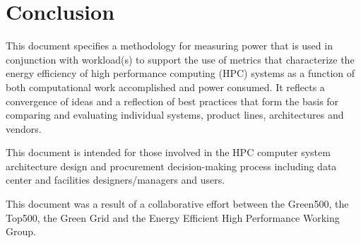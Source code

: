 \chapter{Conclusion}
\label{sec:conclusion}

\noindent
This document specifies a methodology for measuring power that is used in conjunction with workload(s) to support the use of metrics that characterize the energy efficiency of high performance computing (HPC) systems as a function of both computational work accomplished and power consumed. It reflects a convergence of ideas and a reflection of best practices that form the basis for comparing and evaluating individual systems, product lines, architectures and vendors. 
\wl

\noindent
This document is intended for those involved in the HPC computer system architecture design and procurement decision-making process including data center and facilities designers/managers and users.
\wl

\noindent
This document was a result of a collaborative effort between the Green500, the Top500, the Green Grid and the Energy Efficient High Performance Working Group.

